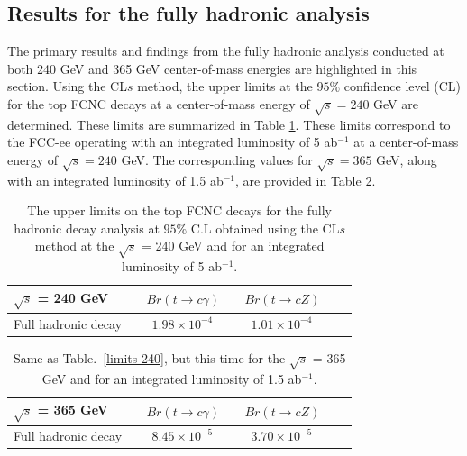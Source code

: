 \documentclass[11pt,onecolumn,english,showpacs,preprintnumbers,amsmath,amssymb,floatfix,nofootinbib]{revtex4-1}
\def\to{\rightarrow}
\begin{document}
\clearpage



\subsection{Results for the fully hadronic analysis}
The primary results and findings from the fully hadronic analysis conducted at both 240 GeV and 365 GeV center-of-mass energies are highlighted in this section.
Using the CL$s$ method, the upper limits at the $95\%$ confidence level (CL) for the top FCNC decays at a center-of-mass energy of $\sqrt{s} = 240$ GeV are determined. These limits are summarized in Table \ref{limits-240-full}. These limits correspond to the FCC-ee operating with an integrated luminosity of 5 ab$^{-1}$ at a center-of-mass energy of $\sqrt{s} = 240$ GeV. The corresponding values for $\sqrt{s} = 365$ GeV, along with an integrated luminosity of 1.5 ab$^{-1}$, are provided in Table \ref{limits-365-full}.

\begin{table}[htbp]
\begin{center}
\begin{tabular}{l|c c c c }  \hline
$\sqrt {s}$ = 240 GeV  &  ~  $Br (t \to c \gamma )$       &  ~ $Br (t \to c Z)$      \\  \hline
Full hadronic decay            &  ~  $1.98  \times 10^{-4}$        & ~ $1.01 \times 10^{-4}$     \\   \hline  \hline
\end{tabular}
\end{center}
\caption{The upper limits on the top FCNC decays for the fully hadronic decay analysis  
at $95\%$ C.L obtained using the CL$s$ method
at the $\sqrt {s}$ = 240 GeV and for an integrated luminosity of 5 ab$^{-1}$.}
\label{limits-240-full}
\end{table}




\begin{table}[htbp]
\begin{center}
\begin{tabular}{l|c c c c }  \hline
$\sqrt {s}$ = 365 GeV  &  ~  $Br (t \to c \gamma )$       &  ~ $Br (t \to c Z)$      \\  \hline
Full hadronic decay           &  ~  $8.45  \times 10^{-5}$        & ~ $3.70  \times 10^{-5}$    \\   \hline  \hline
\end{tabular}
\end{center}
\caption{Same as Table.~\ref{limits-240}, but this time for the 
$\sqrt {s}$ = 365 GeV and for an integrated luminosity of 1.5 ab$^{-1}$.}
\label{limits-365-full}
\end{table}
\end{document}
